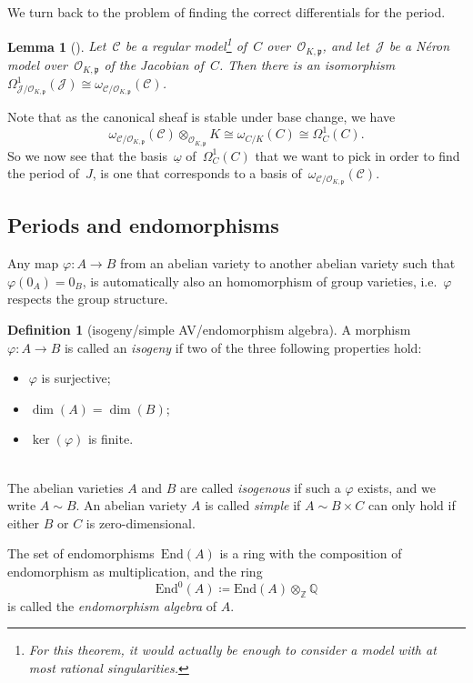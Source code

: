\documentclass[12pt]{article}
\newtheorem{lemma}[theorem]{Lemma}
\theoremstyle{definition}
\newtheorem{definition}[theorem]{Definition}
\numberwithin{equation}{subsection}
\newcommand{\Q}{\ensuremath{\mathbb{Q}}}
\newcommand{\Z}{\ensuremath{\mathbb{Z}}}
\begin{document}
We turn back to the problem of finding the correct differentials for the period.

\begin{lemma}[\textrm{\cite[Lem.~1.3.5]{PhD}}]
Let~$\mathcal{C}$ be a regular model\footnote{For this theorem, it would actually be enough to consider a model with at most rational singularities.} of~$C$ over~$\mathcal{O}_{K,\mathfrak{p}}$, and let~$\mathcal{J}$ be a N\'eron model over~$\mathcal{O}_{K,\mathfrak{p}}$ of the Jacobian of~$C$.
Then there is an isomorphism~$\Omega^1_{\mathcal{J}/\mathcal{O}_{K,\mathfrak{p}}}(\mathcal{J}) \cong \omega_{\mathcal{C}/\mathcal{O}_{K,\mathfrak{p}}}(\mathcal{C})$.
\end{lemma}

Note that as the canonical sheaf is stable under base change, we have~$$\omega_{\mathcal{C}/\mathcal{O}_{K,\mathfrak{p}}}(\mathcal{C}) \otimes_{\mathcal{O}_{K,\mathfrak{p}}} K \cong \omega_{C/K}(C) \cong \Omega^1_C(C).$$
So we now see that the basis~$\underline{\omega}$ of~$\Omega^1_C(C)$ that we want to pick in order to find the period of~$J$, is one that corresponds to a basis of~$\omega_{\mathcal{C}/\mathcal{O}_{K,\mathfrak{p}}}(\mathcal{C})$.

\subsection{Periods and endomorphisms}

Any map $\varphi \colon A \to B$ from an abelian variety to another abelian variety such that $\varphi(0_A) = 0_B$, is automatically also an homomorphism of group varieties, i.e.\ $\varphi$ respects the group structure.

\begin{definition}[isogeny/simple AV/endomorphism algebra]
A morphism $\varphi \colon A \to B$ is called an {\em isogeny} if two of the three following properties hold:\\[-0.8cm]
\begin{itemize}\itemsep0pt
\item $\varphi$ is surjective;
\item $\dim(A) = \dim(B)$;
\item $\ker(\varphi)$ is finite.
\end{itemize}\mbox{}\\[-0.7cm]
The abelian varieties $A$ and $B$ are called {\em isogenous} if such a $\varphi$ exists, and we write $A \sim B$.
An abelian variety $A$ is called {\em simple} if $A \sim B \times C$ can only hold if either $B$ or $C$ is zero-dimensional.

The set of endomorphisms~$\mathrm{End}(A)$ is a ring with the composition of endomorphism as multiplication, and the ring $$\mathrm{End}^0(A) \coloneqq \mathrm{End}(A) \otimes_{\Z} \Q$$ is called the {\em endomorphism algebra} of $A$.
\end{definition}
\end{document}
